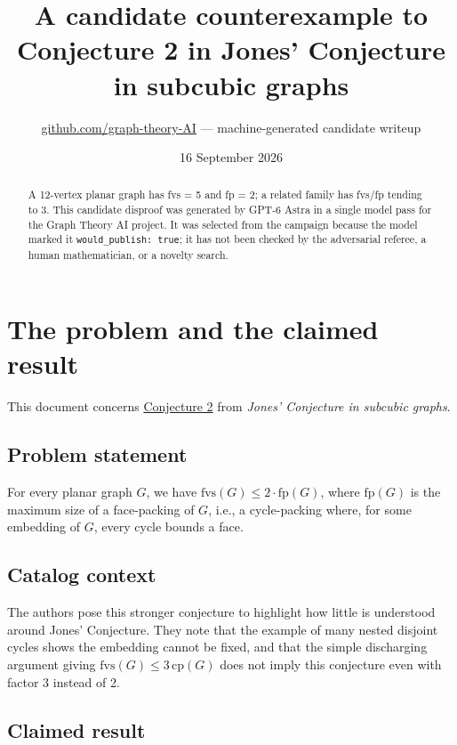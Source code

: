 \documentclass[
  11pt,
  a4paper,
]{article}
\title{A candidate counterexample to Conjecture 2 in Jones' Conjecture
in subcubic graphs}
\author{\href{https://github.com/graph-theory-AI}{github.com/graph-theory-AI}
--- machine-generated candidate writeup}
\date{16 September 2026}
\begin{document}
\maketitle
\begin{abstract}
A 12-vertex planar graph has fvs = 5 and fp = 2; a related family has
fvs/fp tending to 3. This candidate disproof was generated by GPT-6
Astra in a single model pass for the Graph Theory AI project. It was
selected from the campaign because the model marked it
\texttt{would\_publish:\ true}; it has not been checked by the
adversarial referee, a human mathematician, or a novelty search.
\end{abstract}

\section{The problem and the claimed
result}\label{the-problem-and-the-claimed-result}

This document concerns
\href{https://graph-theory-ai.github.io/graph-conjectures/arxiv/1912.01570__00/}{Conjecture
2} from \emph{Jones' Conjecture in subcubic graphs}.

\subsection{Problem statement}\label{problem-statement}

For every planar graph \(G\), we have
\(\mathrm{fvs}(G) \leq 2 \cdot \mathrm{fp}(G)\), where
\(\mathrm{fp}(G)\) is the maximum size of a face-packing of \(G\), i.e.,
a cycle-packing where, for some embedding of \(G\), every cycle bounds a
face.

\subsection{Catalog context}\label{catalog-context}

The authors pose this stronger conjecture to highlight how little is
understood around Jones' Conjecture. They note that the example of many
nested disjoint cycles shows the embedding cannot be fixed, and that the
simple discharging argument giving
\(\mathrm{fvs}(G) \leq 3\,\mathrm{cp}(G)\) does not imply this
conjecture even with factor 3 instead of 2.

\subsection{Claimed result}\label{claimed-result}
\end{document}
